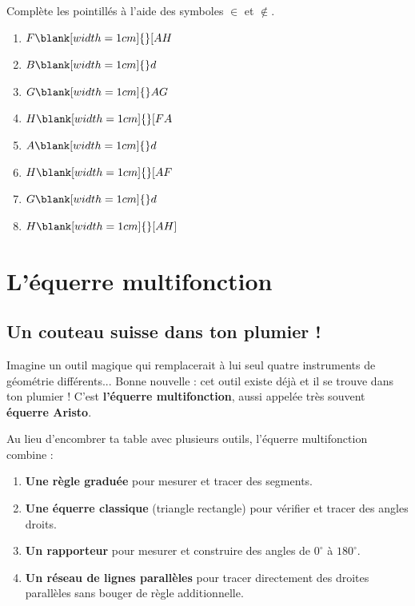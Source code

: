 \documentclass[../../syllabus_1.tex]{subfiles}
\begin{document}
\begin{exercise}
    Complète les pointillés à l'aide des symboles \(\in\) et \(\notin\).
    \begin{center}
    \end{center}
    \begin{enumerate}[itemsep=1cm, cols=4]
        \item \(F \blank[width=1cm]{} [AH\)
        \item \(B \blank[width=1cm]{} d\)
        \item \(G \blank[width=1cm]{} AG\)
        \item \(H \blank[width=1cm]{} [FA\)
        \item \(A \blank[width=1cm]{} d\)
        \item \(H \blank[width=1cm]{} [AF\)
        \item \(G \blank[width=1cm]{} d\)
        \item \(H \blank[width=1cm]{} [AH]\)
    \end{enumerate}
\end{exercise}

\newpage
\section{L'équerre multifonction}
\subsection{Un couteau suisse dans ton plumier !}

Imagine un outil magique qui remplacerait à lui seul quatre instruments de géométrie différents... Bonne nouvelle : cet outil existe déjà et il se trouve dans ton plumier ! C'est \textbf{l'équerre multifonction}, aussi appelée très souvent \textbf{équerre Aristo}.

Au lieu d'encombrer ta table avec plusieurs outils, l'équerre multifonction combine :
\begin{enumerate}
    \item \textbf{Une règle graduée} pour mesurer et tracer des segments.
    \item \textbf{Une équerre classique} (triangle rectangle) pour vérifier et tracer des angles droits.
    \item \textbf{Un rapporteur} pour mesurer et construire des angles de $0^\circ$ à $180^\circ$.
    \item \textbf{Un réseau de lignes parallèles} pour tracer directement des droites parallèles sans bouger de règle additionnelle.
\end{enumerate}
\end{document}

